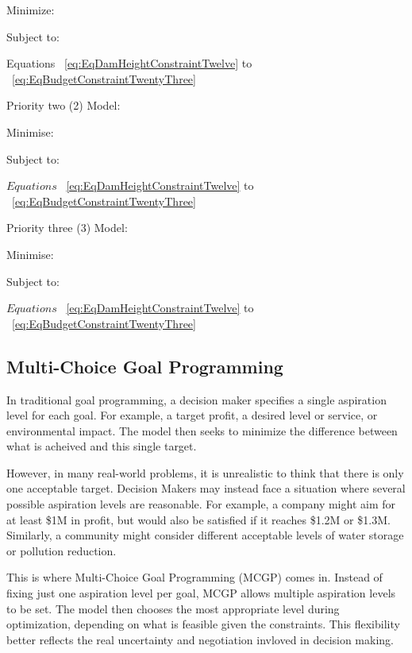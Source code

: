 Minimize:
        \EqLGPObjectivePriorityOneThirtyFive

Subject to:

       \begin{center}
        Equations ~\eqref{eq:EqDamHeightConstraintTwelve} to ~\eqref{eq:EqBudgetConstraintTwentyThree}
       \end{center}  
        

Priority two (2) Model:

Minimise:
        \EqLGPObjectivePriorityTwoThirtySix

Subject to:
         \begin{center}
        $Equations$ ~\eqref{eq:EqDamHeightConstraintTwelve} to ~\eqref{eq:EqBudgetConstraintTwentyThree}
       \end{center}  
        \EqLGPObjectivePriorityOneConstraintThirtyEight

Priority three (3) Model:

Minimise:
        \EqLGPObjectivePriorityThreeThirtySeven

Subject to:
         \begin{center}
        $Equations$ ~\eqref{eq:EqDamHeightConstraintTwelve} to ~\eqref{eq:EqBudgetConstraintTwentyThree}
       \end{center}  
        \EqLGPObjectivePriorityOneConstraintThirtyEight
        \EqLGPObjectivePriorityTwoConstraintThirtyNine

\subsection{Multi-Choice Goal Programming}
In traditional goal programming, a decision maker specifies a single aspiration level for each goal. For example, a target profit, a desired level or service, or environmental impact. The model then seeks to minimize the difference between what is acheived and this single target.

However, in many real-world problems, it is unrealistic to think that there is only one acceptable target. Decision Makers may instead face a situation where several possible aspiration levels are reasonable. For example, a company might aim for at least \$1M in profit, but would also be satisfied if it reaches \$1.2M or \$1.3M. Similarly, a community might consider different acceptable levels of water storage or pollution reduction.

This is where Multi-Choice Goal Programming (MCGP) comes in. Instead of fixing just one aspiration level per goal, MCGP allows multiple aspiration levels to be set. The model then chooses the most appropriate level during optimization, depending on what is feasible given the constraints. This flexibility better reflects the real uncertainty and negotiation invloved in decision making.

